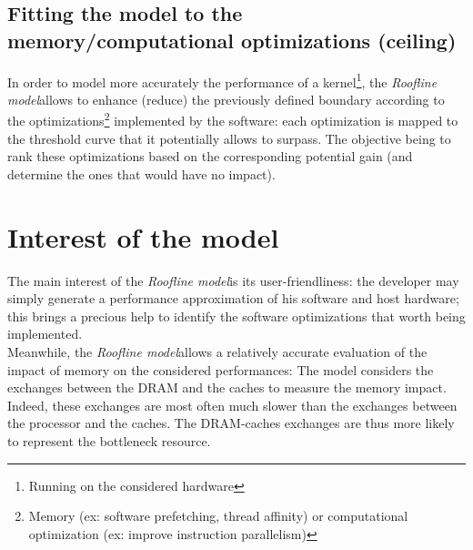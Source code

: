 \documentclass[11pt]{article}											%
\newcommand{\targetname}	{\emph{Roofline model}}
\begin{document}
	\subsection{Fitting the model to the memory/computational optimizations (ceiling)}
	In order to model more accurately the performance of a kernel\footnote{Running on the considered hardware}, the \targetname\space allows to enhance (reduce) the previously defined boundary according to the optimizations\footnote{Memory (ex: software prefetching, thread affinity) or computational optimization (ex: improve instruction parallelism)} implemented by the software:   each optimization is mapped to the threshold curve that it potentially allows to surpass.   The objective being to rank these optimizations based on the corresponding potential gain (and determine the ones that would have no impact).


\section{Interest of the model}\label{section:interestOfTheModel}
	The main interest of the \targetname\space is its user-friendliness: the developer may simply generate a performance approximation of his software and host hardware;   this brings a precious help to identify the software optimizations that worth being implemented.\\
	Meanwhile, the \targetname\space allows a relatively accurate evaluation of the impact of memory on the considered performances:   The model considers the exchanges between the DRAM and the caches to measure the memory impact.   Indeed, these exchanges are most often much slower than the exchanges between the processor and the caches.   The DRAM-caches exchanges are thus more likely to represent the bottleneck resource.

	
	
\end{document}
